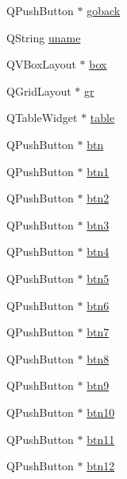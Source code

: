 \begin{DoxyCompactItemize}
\item 
Q\+Push\+Button $\ast$ \hyperlink{classbattleshipgame_af6e3f2baf6edc6b84c09374735715781}{goback}
\item 
Q\+String \hyperlink{classbattleshipgame_a3092de15ed568b0e0da2248f69e4d2ae}{uname}
\item 
Q\+V\+Box\+Layout $\ast$ \hyperlink{classbattleshipgame_a1a9770308ece4820fd52e04102d8ab2a}{box}
\item 
Q\+Grid\+Layout $\ast$ \hyperlink{classbattleshipgame_a7482464866ec78aa63e836fcbe140f7b}{gr}
\item 
Q\+Table\+Widget $\ast$ \hyperlink{classbattleshipgame_a0f047492a583f3ecb30f4441af96fd65}{table}
\item 
Q\+Push\+Button $\ast$ \hyperlink{classbattleshipgame_ad69b5164ed0619503c23ab0011344124}{btn}
\item 
Q\+Push\+Button $\ast$ \hyperlink{classbattleshipgame_ab3b1f8f9601305a8e345bda161666d13}{btn1}
\item 
Q\+Push\+Button $\ast$ \hyperlink{classbattleshipgame_aca451e562a028c290ef2815728ca97f7}{btn2}
\item 
Q\+Push\+Button $\ast$ \hyperlink{classbattleshipgame_a40ec25b91f0b8db4c03f7c94acf864b1}{btn3}
\item 
Q\+Push\+Button $\ast$ \hyperlink{classbattleshipgame_ab33b73ec573021344ee7ed656921d876}{btn4}
\item 
Q\+Push\+Button $\ast$ \hyperlink{classbattleshipgame_a95ab72ea774dff3106badf103fb198a5}{btn5}
\item 
Q\+Push\+Button $\ast$ \hyperlink{classbattleshipgame_a0987f6bf3944c5778139e8a08814e674}{btn6}
\item 
Q\+Push\+Button $\ast$ \hyperlink{classbattleshipgame_a09d3273e09733ae74f1802cc3c7348cf}{btn7}
\item 
Q\+Push\+Button $\ast$ \hyperlink{classbattleshipgame_a43597ab31039bbda7fa011c718984d59}{btn8}
\item 
Q\+Push\+Button $\ast$ \hyperlink{classbattleshipgame_ae61d21dfb271dd2d3e09ba3f7e166dba}{btn9}
\item 
Q\+Push\+Button $\ast$ \hyperlink{classbattleshipgame_a2f2b56bdb7b3ef3ff22c41c3f684df5f}{btn10}
\item 
Q\+Push\+Button $\ast$ \hyperlink{classbattleshipgame_a0749ced7f1ef6e0703d3c399aac4b67e}{btn11}
\item 
Q\+Push\+Button $\ast$ \hyperlink{classbattleshipgame_ad79560e8c4723f47854eec7160f772bb}{btn12}

\end{DoxyCompactItemize}
